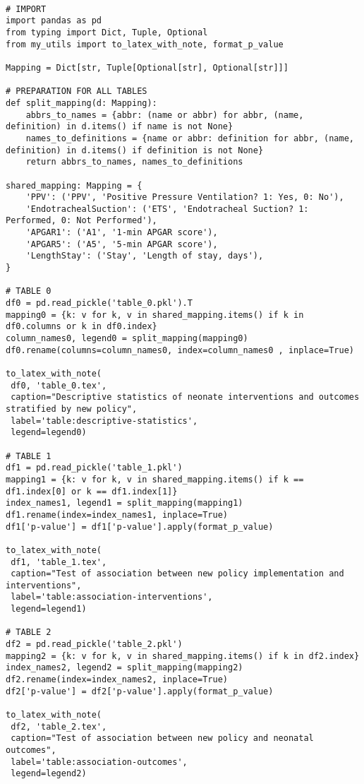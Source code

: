 \documentclass[11pt]{article}
\begin{document}
\begin{verbatim}

# IMPORT
import pandas as pd
from typing import Dict, Tuple, Optional
from my_utils import to_latex_with_note, format_p_value

Mapping = Dict[str, Tuple[Optional[str], Optional[str]]]

# PREPARATION FOR ALL TABLES
def split_mapping(d: Mapping):
    abbrs_to_names = {abbr: (name or abbr) for abbr, (name, definition) in d.items() if name is not None}
    names_to_definitions = {name or abbr: definition for abbr, (name, definition) in d.items() if definition is not None}
    return abbrs_to_names, names_to_definitions

shared_mapping: Mapping = {
    'PPV': ('PPV', 'Positive Pressure Ventilation? 1: Yes, 0: No'),
    'EndotrachealSuction': ('ETS', 'Endotracheal Suction? 1: Performed, 0: Not Performed'),
    'APGAR1': ('A1', '1-min APGAR score'),
    'APGAR5': ('A5', '5-min APGAR score'),
    'LengthStay': ('Stay', 'Length of stay, days'),
}

# TABLE 0
df0 = pd.read_pickle('table_0.pkl').T
mapping0 = {k: v for k, v in shared_mapping.items() if k in df0.columns or k in df0.index}
column_names0, legend0 = split_mapping(mapping0)
df0.rename(columns=column_names0, index=column_names0 , inplace=True)

to_latex_with_note(
 df0, 'table_0.tex',
 caption="Descriptive statistics of neonate interventions and outcomes stratified by new policy", 
 label='table:descriptive-statistics',
 legend=legend0)

# TABLE 1
df1 = pd.read_pickle('table_1.pkl')
mapping1 = {k: v for k, v in shared_mapping.items() if k == df1.index[0] or k == df1.index[1]}
index_names1, legend1 = split_mapping(mapping1)
df1.rename(index=index_names1, inplace=True)
df1['p-value'] = df1['p-value'].apply(format_p_value)

to_latex_with_note(
 df1, 'table_1.tex',
 caption="Test of association between new policy implementation and interventions", 
 label='table:association-interventions',
 legend=legend1)

# TABLE 2
df2 = pd.read_pickle('table_2.pkl')
mapping2 = {k: v for k, v in shared_mapping.items() if k in df2.index}
index_names2, legend2 = split_mapping(mapping2)
df2.rename(index=index_names2, inplace=True)
df2['p-value'] = df2['p-value'].apply(format_p_value)

to_latex_with_note(
 df2, 'table_2.tex',
 caption="Test of association between new policy and neonatal outcomes", 
 label='table:association-outcomes',
 legend=legend2)

\end{verbatim}
\end{document}

